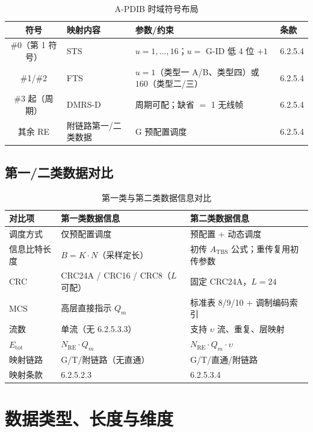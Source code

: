 \documentclass[11pt,a4paper]{ctexart}
\begin{document}
\begin{table}[h]
\centering
\small
\caption{A-PDIB 时域符号布局}
\begin{tabular}{clll}
\toprule
\textbf{符号} & \textbf{映射内容} & \textbf{参数/约束} & \textbf{条款} \\
\midrule
\#0（第 1 符号） & STS & $u=1,\ldots,16$；$u=$ G-ID 低 4 位 $+1$ & 6.2.5.4 \\
\#1/\#2 & FTS & $u=1$（类型一 A/B、类型四）或 $160$（类型二/三） & 6.2.5.4 \\
\#3 起（周期） & DMRS-D & 周期可配；缺省 $=$ 1 无线帧 & 6.2.5.4 \\
其余 RE & 附链路第一/二类数据 & G 预配置调度 & 6.2.5.4 \\
\bottomrule
\end{tabular}
\end{table}

\subsection{第一/二类数据对比}

\begin{table}[h]
\centering
\small
\caption{第一类与第二类数据信息对比}
\begin{tabular}{L{3.2cm}L{5.5cm}L{5.5cm}}
\toprule
\textbf{对比项} & \textbf{第一类数据信息} & \textbf{第二类数据信息} \\
\midrule
调度方式 & 仅预配置调度 & 预配置 + 动态调度 \\
信息比特长度 & $B = K \cdot N$（采样定长） & 初传 $A_{\mathrm{TBS}}$ 公式；重传复用初传参数 \\
CRC & CRC24A / CRC16 / CRC8（$L$ 可配） & 固定 CRC24A，$L=24$ \\
MCS & 高层直接指示 $Q_m$ & 标准表 8/9/10 + 调制编码索引 \\
流数 & 单流（无 6.2.5.3.3） & 支持 $\upsilon$ 流、重复、层映射 \\
$E_{\mathrm{tot}}$ & $N_{\mathrm{RE}} \cdot Q_m$ & $N_{\mathrm{RE}} \cdot Q_m \cdot \upsilon$ \\
映射链路 & G/T/附链路（无直通） & G/T/直通/附链路 \\
映射条款 & 6.2.5.2.3 & 6.2.5.3.4 \\
\bottomrule
\end{tabular}
\end{table}

\section{数据类型、长度与维度}
\end{document}
